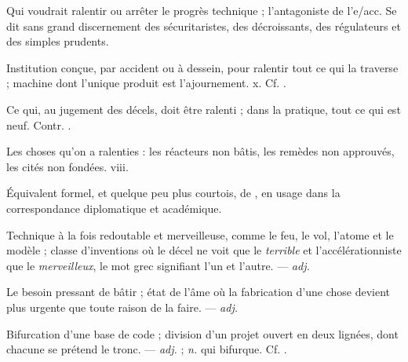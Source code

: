   Qui voudrait ralentir ou arrêter le progrès technique ; l'antagoniste de l'e/acc. Se dit sans grand discernement des sécuritaristes, des décroissants, des régulateurs et des simples prudents.

 Institution conçue, par accident ou à dessein, pour ralentir tout ce qui la traverse ; machine dont l'unique produit est l'ajournement.   x. Cf. .

 Ce qui, au jugement des décels, doit être ralenti ; dans la pratique, tout ce qui est neuf. Contr. .

  Les choses qu'on a ralenties : les réacteurs non bâtis, les remèdes non approuvés, les cités non fondées.   viii.

 Équivalent formel, et quelque peu plus courtois, de , en usage dans la correspondance diplomatique et académique.

 Technique à la fois redoutable et merveilleuse, comme le feu, le vol, l'atome et le modèle ; classe d'inventions où le décel ne voit que le \textit{terrible} et l'accélérationniste que le \textit{merveilleux}, le mot grec signifiant l'un et l'autre. ---  \textit{adj.}

 Le besoin pressant de bâtir ; état de l'âme où la fabrication d'une chose devient plus urgente que toute raison de la faire.  ---  \textit{adj.}

 Bifurcation d'une base de code ; division d'un projet ouvert en deux lignées, dont chacune se prétend le tronc.   ---  \textit{adj.} ;  \textit{n.} qui bifurque. Cf. .

